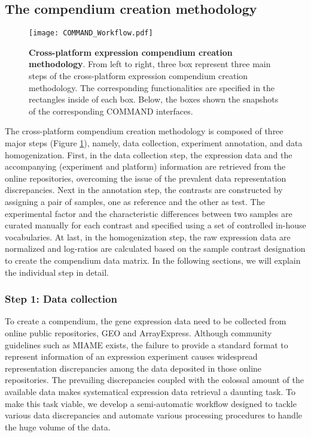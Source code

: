 \subsection{The compendium creation methodology}
\label{sec:colombos-comp-method}

\begin{figure}
  \centering
  \texttt{[image: COMMAND\_Workflow.pdf]}
  \caption[Cross-platform expression compendium creation methodology]{
    \textbf{Cross-platform expression compendium creation methodology}.  From
     left to right, three box represent three main steps of the cross-platform
     expression compendium creation methodology.  The corresponding
     functionalities are specified in the rectangles inside of each box.
     Below, the boxes shown the snapshots of the corresponding COMMAND
     interfaces.}
  \label{fig:command-workflow}
\end{figure}

The cross-platform compendium creation methodology is composed of three major steps (Figure \ref{fig:command-workflow}), namely, data collection, experiment annotation, and data homogenization. First, in the data collection step, the expression data and the accompanying (experiment and platform) information are retrieved from the online repositories, overcoming the issue of the prevalent data representation discrepancies. Next in the annotation step, the contrasts are constructed by assigning a pair of samples, one as reference and the other as test.  The experimental factor and the characteristic differences between two samples are curated manually for each contrast and specified using a set of controlled in-house vocabularies. At last, in the homogenization step, the raw expression data are normalized and log-ratios are calculated based on the sample contrast designation to create the compendium data matrix. In the following sections, we will explain the individual step in detail.


\subsubsection{Step 1: Data collection}

To create a compendium, the gene expression data need to be collected from online public repositories, GEO and ArrayExpress. Although community guidelines such as MIAME \cite{Brazma2001} exists, the failure to provide a standard format to represent information of an expression experiment causes widespread representation discrepancies among the data deposited in those online repositories. The prevailing discrepancies coupled with the colossal amount of the available data makes systematical expression data retrieval a daunting task. To make this task viable, we develop a semi-automatic workflow designed to tackle various data discrepancies and automate various processing procedures to handle the huge volume of the data. 

